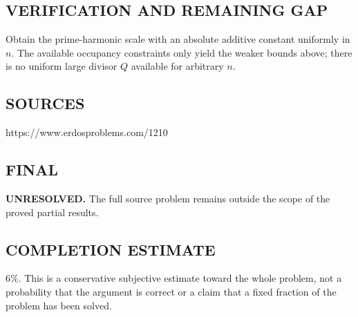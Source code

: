 \subsection*{VERIFICATION AND REMAINING GAP}
Obtain the prime-harmonic scale with an absolute additive constant uniformly
in $n$. The available occupancy constraints only yield the weaker bounds above;
there is no uniform large divisor $Q$ available for arbitrary $n$.

\subsection*{SOURCES}
https://www.erdosproblems.com/1210

\subsection*{FINAL}
\textbf{UNRESOLVED.} The full source problem remains outside the scope of the proved partial results.

\subsection*{COMPLETION ESTIMATE}
$6\%$. This is a conservative subjective estimate toward the whole problem, not a probability that the argument is correct or a claim that a fixed fraction of the problem has been solved.
